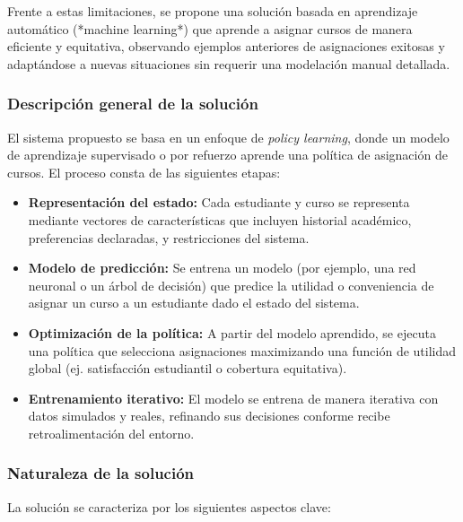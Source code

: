 \documentclass{article}
\begin{document}
Frente a estas limitaciones, se propone una solución basada en aprendizaje automático (*machine learning*) que aprende a asignar cursos de manera eficiente y equitativa, observando ejemplos anteriores de asignaciones exitosas y adaptándose a nuevas situaciones sin requerir una modelación manual detallada.

\subsubsection{Descripción general de la solución}

El sistema propuesto se basa en un enfoque de \textit{policy learning}, donde un modelo de aprendizaje supervisado o por refuerzo aprende una política de asignación de cursos. El proceso consta de las siguientes etapas:

\begin{itemize}
  \item \textbf{Representación del estado:} Cada estudiante y curso se representa mediante vectores de características que incluyen historial académico, preferencias declaradas, y restricciones del sistema.
  \item \textbf{Modelo de predicción:} Se entrena un modelo (por ejemplo, una red neuronal o un árbol de decisión) que predice la utilidad o conveniencia de asignar un curso a un estudiante dado el estado del sistema.
  \item \textbf{Optimización de la política:} A partir del modelo aprendido, se ejecuta una política que selecciona asignaciones maximizando una función de utilidad global (ej. satisfacción estudiantil o cobertura equitativa).
  \item \textbf{Entrenamiento iterativo:} El modelo se entrena de manera iterativa con datos simulados y reales, refinando sus decisiones conforme recibe retroalimentación del entorno.
\end{itemize}

\subsubsection{Naturaleza de la solución}

La solución se caracteriza por los siguientes aspectos clave:
\end{document}
